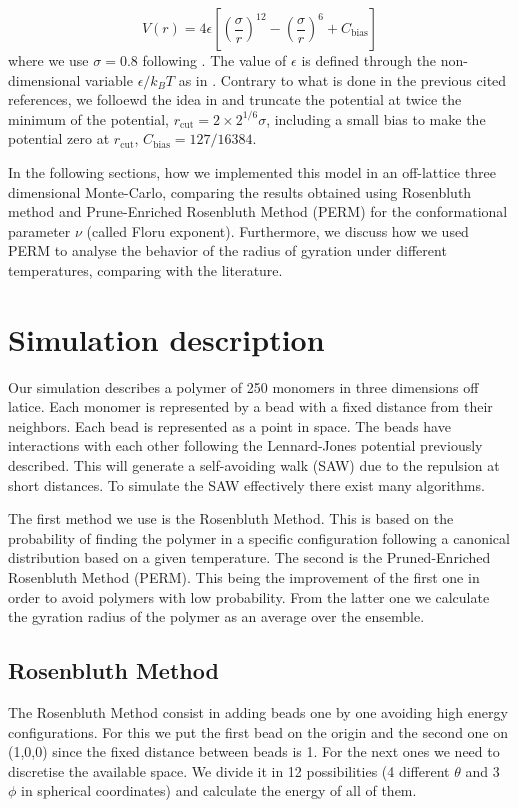 \documentclass[aps,prl,reprint,groupedaddress]{revtex4-1}
\begin{document}
\begin{equation}
	V(r) = 4 \epsilon \left[\left(\frac{\sigma}{r} \right)^{12} - \left(\frac{\sigma}{r} \right)^{6} + C_{\text{bias}}\right]
\end{equation}
where we use $\sigma = 0.8$ following \cite{Yong1996, ICCPBook}. The value of $\epsilon$ is defined through the non-dimensional variable $\epsilon/k_B T$ as in \cite{Grassberger1997, Yong1996}. Contrary to what is done in the previous cited references, we folloewd the idea in \cite{mc_polymer_review} and truncate the potential at twice the minimum of the potential, $r_{\text{cut}} = 2 \times 2^{1/6} \sigma$, including a small bias to make the potential zero at $r_{\text{cut}}$, $C_{\text{bias}} = 127/16384$.

In the following sections, how we implemented this model in an off-lattice three dimensional Monte-Carlo, comparing the results obtained using Rosenbluth method and Prune-Enriched Rosenbluth Method (PERM) for the conformational parameter $\nu$ (called Floru exponent). Furthermore, we discuss how we used PERM to analyse the behavior of the radius of gyration under different temperatures, comparing with the literature.

\section{Simulation description \label{description}}
Our simulation describes a polymer of 250 monomers in three dimensions off latice. Each monomer is represented by a bead with a fixed distance from their neighbors. Each bead is represented as a point in space. The beads have interactions with each other following the Lennard-Jones potential previously described. This will generate a self-avoiding walk (SAW) due to the repulsion at short distances. To simulate the SAW effectively there exist many algorithms. 

The first method we use is the Rosenbluth Method. This is based on the probability of finding the polymer in a specific configuration following a canonical distribution based on a given temperature.  The second is the Pruned-Enriched Rosenbluth Method (PERM). This being the improvement of the first one in order to avoid polymers with low probability. From the latter one we calculate the gyration radius of the polymer as an average over the ensemble.

\subsection{Rosenbluth Method}
The Rosenbluth Method consist in adding beads one by one avoiding high energy configurations. For this we put the first bead on the origin and the second one on (1,0,0) since the fixed distance between beads is 1. For the next ones we need to discretise the available space. We divide it in 12 possibilities (4 different $\theta$ and 3 $\phi$ in spherical coordinates) and calculate the energy of all of them. 
\end{document}
